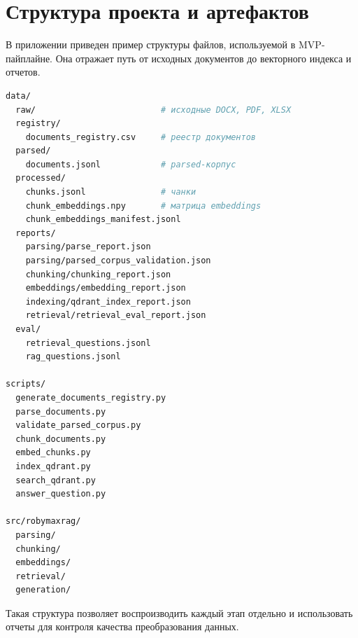 \chapter{Структура проекта и артефактов}
\label{appendix:artifacts}

В приложении приведен пример структуры файлов, используемой в MVP-пайплайне. Она отражает путь от исходных документов до векторного индекса и отчетов.

\begin{lstlisting}[language=bash,caption={Основные каталоги и артефакты MVP}]
data/
  raw/                         # исходные DOCX, PDF, XLSX
  registry/
    documents_registry.csv     # реестр документов
  parsed/
    documents.jsonl            # parsed-корпус
  processed/
    chunks.jsonl               # чанки
    chunk_embeddings.npy       # матрица embeddings
    chunk_embeddings_manifest.jsonl
  reports/
    parsing/parse_report.json
    parsing/parsed_corpus_validation.json
    chunking/chunking_report.json
    embeddings/embedding_report.json
    indexing/qdrant_index_report.json
    retrieval/retrieval_eval_report.json
  eval/
    retrieval_questions.jsonl
    rag_questions.jsonl

scripts/
  generate_documents_registry.py
  parse_documents.py
  validate_parsed_corpus.py
  chunk_documents.py
  embed_chunks.py
  index_qdrant.py
  search_qdrant.py
  answer_question.py

src/robymaxrag/
  parsing/
  chunking/
  embeddings/
  retrieval/
  generation/
\end{lstlisting}

Такая структура позволяет воспроизводить каждый этап отдельно и использовать отчеты для контроля качества преобразования данных.

